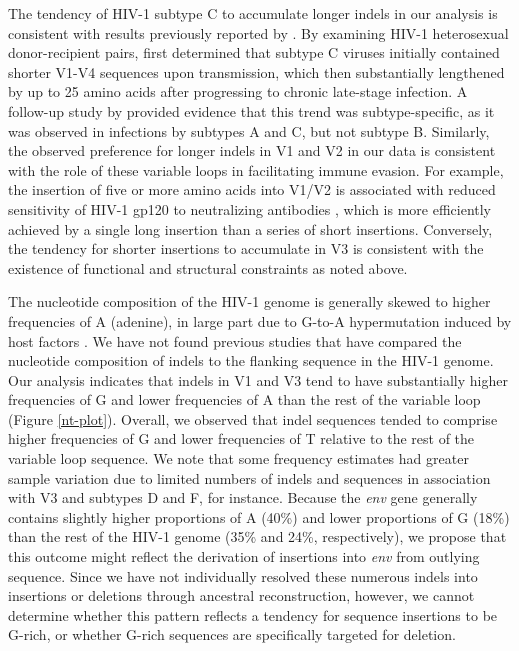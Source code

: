 \documentclass[12pt]{article}
\begin{document}
The tendency of HIV-1 subtype C to accumulate longer indels in our analysis is consistent with results previously reported by \citet{Derdeyn:2004}. %
By examining HIV-1 heterosexual donor-recipient pairs, \citet{Derdeyn:2004} first determined that subtype C viruses initially contained shorter V1-V4 sequences upon transmission, which then substantially lengthened by up to 25 amino acids after progressing to chronic late-stage infection. 
A follow-up study by \citet{Chohan:2005} provided evidence that this trend was subtype-specific, as it was observed in infections by subtypes A and C, but not subtype B.
Similarly, the observed preference for longer indels in V1 and V2 in our data is consistent with the role of these variable loops in facilitating immune evasion.
For example, the insertion of five or more amino acids into V1/V2 is associated with reduced sensitivity of HIV-1 gp120 to neutralizing antibodies \citep{Curlin:2010, Sagar:2006}, which is more efficiently achieved by a single long insertion than a series of short insertions. 
Conversely, the tendency for shorter insertions to accumulate in V3 is consistent with the existence of functional and structural constraints as noted above.



The nucleotide composition of the HIV-1 genome is generally skewed to higher frequencies of A (adenine), in large part due to G-to-A hypermutation induced by host factors \citep{Lidd2004apobec}.
We have not found previous studies that have compared the nucleotide composition of indels to the flanking sequence in the HIV-1 genome.
Our analysis indicates that indels in V1 and V3 tend to have substantially higher frequencies of G and lower frequencies of A than the rest of the variable loop (Figure \ref{nt-plot}).
Overall, we observed that indel sequences tended to comprise higher frequencies of G and lower frequencies of T relative to the rest of the variable loop sequence.
We note that some frequency estimates had greater sample variation due to limited numbers of indels and sequences in association with V3 and subtypes D and F, for instance.
Because the \textit{env} gene generally contains slightly higher proportions of A (40\%) and lower proportions of G (18\%) than the rest of the HIV-1 genome (35\% and 24\%, respectively), we propose that this outcome might reflect the derivation of insertions into \textit{env} from outlying sequence.
Since we have not individually resolved these numerous indels into insertions or deletions through ancestral reconstruction, however, we cannot determine whether this pattern reflects a tendency for sequence insertions to be G-rich, or whether G-rich sequences are specifically targeted for deletion.
\end{document}
